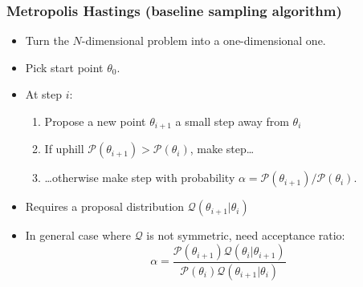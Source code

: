 \documentclass[aspectratio=169]{beamer}
\begin{document}
\begin{frame}
    \frametitle{Metropolis Hastings (baseline sampling algorithm)} 
    \begin{itemize}
        \item Turn the $N$-dimensional problem into a one-dimensional one.
        \item Pick start point $\theta_0$.
        \item At step $i$:
            \begin{enumerate}
                \item Propose a new point $\theta_{i+1}$ a small step away from $\theta_{i}$
                \item If uphill $\mathcal{P}(\theta_{i+1}) > \mathcal{P}(\theta_i)$, make step\ldots
                \item \ldots otherwise make step with probability $\alpha = \mathcal{P}(\theta_{i+1}) / \mathcal{P}(\theta_i)$. 
            \end{enumerate}
        \item Requires a proposal distribution $\mathcal{Q}(\theta_{i+1}|\theta_i)$
        \item In general case where $\mathcal{Q}$ is not symmetric, need acceptance ratio:
            \begin{equation*}
                \alpha = \frac{\mathcal{P}(\theta_{i+1})\mathcal{Q}(\theta_{i}|\theta_{i+1})}{\mathcal{P}(\theta_{i})\mathcal{Q}(\theta_{i+1}|\theta_{i})}
            \end{equation*}
    \end{itemize}
\end{frame}
\end{document}
